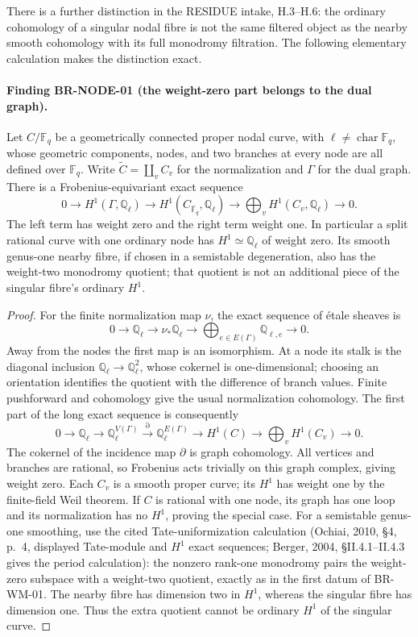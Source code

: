 There is a further distinction in the RESIDUE intake, H.3--H.6:
the ordinary cohomology of a singular nodal fibre is not the same
filtered object as the nearby smooth cohomology with its full
monodromy filtration.  The following elementary calculation makes
the distinction exact.

\paragraph{Finding BR-NODE-01 (the weight-zero part belongs to the dual graph).}
Let $C/\mathbb F_q$ be a geometrically connected proper nodal curve,
with $\ell\ne\operatorname{char}\mathbb F_q$, whose geometric
components, nodes, and two branches at every node are all defined over
$\mathbb F_q$.  Write $\widetilde C=\coprod_v C_v$ for the
normalization and $\Gamma$ for the dual graph.  There is a
Frobenius-equivariant exact sequence
\[
 0\longrightarrow H^1(\Gamma,\mathbb Q_\ell)
 \longrightarrow H^1(C_{\overline{\mathbb F}_q},\mathbb Q_\ell)
 \longrightarrow\bigoplus_vH^1(C_v,\mathbb Q_\ell)
 \longrightarrow0.
\]
The left term has weight zero and the right term weight one.
In particular a split rational curve with one ordinary node has
$H^1\simeq\mathbb Q_\ell$ of weight zero.  Its smooth genus-one
nearby fibre, if chosen in a semistable degeneration, also has the
weight-two monodromy quotient; that quotient is not an additional
piece of the singular fibre's ordinary $H^1$.

\begin{proof}
For the finite normalization map $\nu$, the exact sequence of
\'etale sheaves is
\[
 0\longrightarrow\mathbb Q_\ell
 \longrightarrow\nu_*\mathbb Q_\ell
 \longrightarrow\bigoplus_{e\in E(\Gamma)}\mathbb Q_{\ell,e}
 \longrightarrow0.
\]
Away from the nodes the first map is an isomorphism.  At a node
its stalk is the diagonal inclusion $\mathbb Q_\ell\to
\mathbb Q_\ell^2$, whose cokernel is one-dimensional; choosing
an orientation identifies the quotient with the difference of
branch values.  Finite pushforward and cohomology give the usual
normalization cohomology.  The first part of the long exact
sequence is consequently
\[
 0\to\mathbb Q_\ell\to\mathbb Q_\ell^{V(\Gamma)}
 \xrightarrow{\partial}\mathbb Q_\ell^{E(\Gamma)}
 \to H^1(C)\to\bigoplus_vH^1(C_v)\to0.
\]
The cokernel of the incidence map $\partial$ is graph cohomology.
All vertices and branches are rational, so Frobenius acts trivially
on this graph complex, giving weight zero.  Each $C_v$ is a smooth
proper curve; its $H^1$ has weight one by the finite-field Weil
theorem.  If $C$ is rational with one node, its graph has one
loop and its normalization has no $H^1$, proving the special case.
For a semistable genus-one smoothing, use the cited Tate-uniformization
calculation (Ochiai, 2010, \S4, p.~4, displayed Tate-module and
$H^1$ exact sequences; Berger, 2004, \S II.4.1--II.4.3 gives the
period calculation): the nonzero rank-one monodromy pairs the
weight-zero subspace with a weight-two quotient, exactly as in the
first datum of BR-WM-01.
The nearby fibre has dimension two in $H^1$, whereas the singular
fibre has dimension one.  Thus the extra quotient cannot be
ordinary $H^1$ of the singular curve.
\end{proof}

